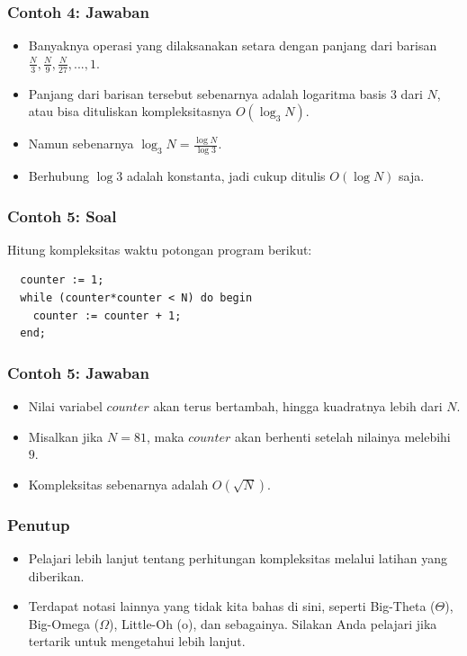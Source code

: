 \documentclass{beamer}
\begin{document}
\begin{frame}
\frametitle{Contoh 4: Jawaban}
\begin{itemize}
  \item Banyaknya operasi yang dilaksanakan setara dengan panjang dari barisan $\frac{N}{3}, \frac{N}{9}, \frac{N}{27}, ..., 1$.
  \item Panjang dari barisan tersebut sebenarnya adalah logaritma basis 3 dari $N$, atau bisa dituliskan kompleksitasnya $O(\log_3{N})$.
  \item Namun sebenarnya $\log_3{N} = \frac{\log{N}}{\log{3}}$.
  \item Berhubung $\log{3}$ adalah konstanta, jadi cukup ditulis $O(\log{N})$ saja.
\end{itemize}
\end{frame}

\begin{frame}[fragile]
\frametitle{Contoh 5: Soal}
Hitung kompleksitas waktu potongan program berikut:

\hfill

\begin{lstlisting}
  counter := 1;
  while (counter*counter < N) do begin
    counter := counter + 1;
  end;
\end{lstlisting}
\end{frame}

\begin{frame}
\frametitle{Contoh 5: Jawaban}
\begin{itemize}
  \item Nilai variabel $counter$ akan terus bertambah, hingga kuadratnya lebih dari $N$.
  \item Misalkan jika $N = 81$, maka $counter$ akan berhenti setelah nilainya melebihi $9$.
  \item Kompleksitas sebenarnya adalah $O(\sqrt{N})$.
\end{itemize}
\end{frame}

\begin{frame}
\frametitle{Penutup}
\begin{itemize}
  \item Pelajari lebih lanjut tentang perhitungan kompleksitas melalui latihan yang diberikan.
  \item Terdapat notasi lainnya yang tidak kita bahas di sini, seperti Big-Theta ($\Theta$), Big-Omega ($\Omega$), Little-Oh (o), dan sebagainya. Silakan Anda pelajari jika tertarik untuk mengetahui lebih lanjut.
\end{itemize}
\end{frame}
\end{document}
